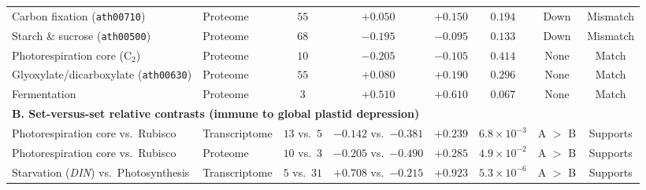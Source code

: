 \documentclass[final,5p,times,twocolumn,numbers,sort&compress]{elsarticle}
\begin{document}
\begin{table}[tbp]
{\begin{tabular}{llcccccc}
Carbon fixation (\texttt{ath00710}) & Proteome & $55$ & $+0.050$ & $+0.150$ & $0.194$ & Down & Mismatch \\
Starch \& sucrose (\texttt{ath00500}) & Proteome & $68$ & $-0.195$ & $-0.095$ & $0.133$ & Down & Mismatch \\
Photorespiration core ($\mathrm{C_2}$) & Proteome & $10$ & $-0.205$ & $-0.105$ & $0.414$ & None & Match \\
Glyoxylate/dicarboxylate (\texttt{ath00630}) & Proteome & $55$ & $+0.080$ & $+0.190$ & $0.296$ & None & Match \\
Fermentation & Proteome & $3$ & $+0.510$ & $+0.610$ & $0.067$ & None & Match \\
\midrule
\multicolumn{8}{l}{\textbf{B. Set-versus-set relative contrasts (immune to global plastid depression)}} \\
\midrule
Photorespiration core vs.\ Rubisco & Transcriptome & $13$ vs.\ $5$ & $-0.142$ vs.\ $-0.381$ & $+0.239$ & $6.8\times 10^{-3}$ & A $>$ B & Supports \\
Photorespiration core vs.\ Rubisco & Proteome & $10$ vs.\ $3$ & $-0.205$ vs.\ $-0.490$ & $+0.285$ & $4.9\times 10^{-2}$ & A $>$ B & Supports \\
Starvation (\textit{DIN}) vs.\ Photosynthesis & Transcriptome & $5$ vs.\ $31$ & $+0.708$ vs.\ $-0.215$ & $+0.923$ & $5.3\times 10^{-6}$ & A $>$ B & Supports \\
\bottomrule
\end{tabular}%
}
\end{table}
\end{document}
